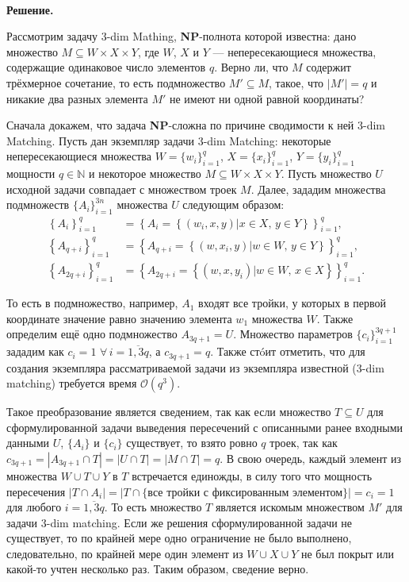 \documentclass[10pt]{article}
\begin{document}
\ \\[0.3cm]
\textbf{Решение.} 
\medskip\par 
Рассмотрим задачу 3-dim Mathing, \textbf{NP}-полнота которой известна: дано множество  $M \subseteq W\times X\times Y$, где $W$, $X$ и $Y$ --- непересекающиеся множества, содержащие одинаковое число элементов $q$. Верно ли, что $M$ содержит трёхмерное сочетание, то есть подмножество $M'\subseteq M$, такое, что $|M'|=q$ и никакие два разных элемента $M'$ не имеют ни одной равной координаты?
\medskip\par
Сначала докажем, что задача \textbf{NP}-сложна по причине сводимости к ней 3-dim Matching. Пусть дан экземпляр задачи 3-dim Matching: некоторые непересекающиеся множества $W=\{w_i\}_{i=1}^q$, $X=\{x_i\}_{i=1}^q$, $Y=\{y_i\}_{i=1}^q$ мощности $q\in\mathbb{N}$ и некоторое множество $M\subseteq W\times X\times Y$. Пусть множество $U$ исходной задачи совпадает с множеством троек $M$. Далее, зададим множества подмножеств $\{A_i\}_{i=1}^{3n}$ множества $U$ следующим образом: 
\begin{align*}
\left\{A_{i}\right\}_{i=1}^q &=  \left\{A_i=\left\{(w_i, x, y)|x\in X,\, y\in Y\right\}\right\}_{i=1}^q,\\
\left\{A_{q+i}\right\}_{i=1}^q &= \left\{A_{q+i}=\left\{(w, x_i, y)|w\in W,\, y\in Y\right\}\right\}_{i=1}^q,\\
\left\{A_{2q+i}\right\}_{i=1}^q &= \left\{A_{2q+i}=\left\{(w, x, y_i)|w\in W,\, x\in X\right\}\right\}_{i=1}^q.
\end{align*}
\par То есть в подмножество, например, $A_1$ входят все тройки, у которых в первой координате значение равно значению элемента $w_1$ множества $W$. 
Также определим ещё одно подмножество $A_{3q+1}=U$. Множество параметров $\{c_i\}_{i=1}^{3q+1}$ зададим как $c_i=1$ $\forall\,i=\overline{1, 3q}$, а $c_{3q+1}=q$.
Также ст\'{o}ит отметить, что для создания экземпляра рассматриваемой задачи из экземпляра известной (3-dim matching) требуется время $\mathcal{O}(q^3)$.
\medskip\par 
Такое преобразование является сведением, так как если множество $T\subseteq U$ для сформулированной задачи выведения пересечений с описанными ранее входными данными $U$, $\{A_i\}$ и $\{c_i\}$ существует, то взято ровно $q$ троек, так как $c_{3q+1}=|A_{3q+1}\cap T|= |U\cap T| = |M \cap T| = q$. В свою очередь, каждый элемент из множества $W\cup T\cup Y$ в $T$ встречается единожды, в силу того что мощность пересечения $|T \cap A_i| = |T \cap \{\text{все тройки с фиксированным элементом}\}| = c_i = 1$ для любого $i=\overline{1,3q}$. То есть множество $T$ является искомым множеством $M'$ для задачи 3-dim matching. Если же решения сформулированной задачи не существует, то по крайней мере одно ограничение не было выполнено, следовательно, по крайней мере один элемент из $W\cup X\cup Y$ не был покрыт или какой-то учтен несколько раз. Таким образом, сведение верно.
\end{document}
